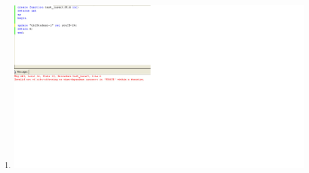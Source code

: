 \documentclass{article}
\begin{document}
\begin{enumerate}
	\item
		\includegraphics[scale=0.5]{figs/im-7-exec-update.jpg}
\end{enumerate}
\end{document}
